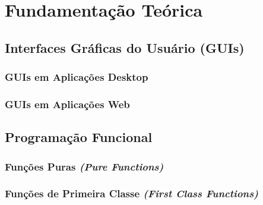 \section{Fundamentação Teórica}
\label{sec:fund-teor}

\subsection{Interfaces Gráficas do Usuário (GUIs)}
\label{sec:guis}

\subsubsection{GUIs em Aplicações Desktop}
\label{sec:guis-desktop}


\subsubsection{GUIs em Aplicações Web}
\label{sec:guis-web}

%
%

\subsection{Programação Funcional}
\label{sec:prog-funcional}



\subsubsection{Funções Puras \emph{(Pure Functions)}}
\label{sec:func-puras}


\subsubsection{Funções de Primeira Classe \emph{(First Class Functions)}}


